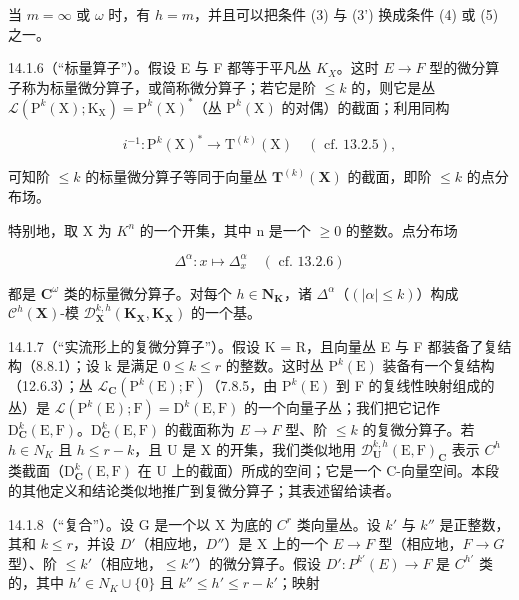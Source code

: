 当 \(m = \infty\) 或 \(\omega\) 时，有 \(h = m\)，并且可以把条件 (3) 与 (3') 换成条件 (4) 或 (5) 之一。

14.1.6（“标量算子”）。假设 E 与 F 都等于平凡丛 \(K_{X}\)。这时 \(E \rightarrow F\) 型的微分算子称为标量微分算子，或简称微分算子；若它是阶 \(\leqslant k\) 的，则它是丛 \(\mathcal{L}(\mathrm{P}^{k}(\mathrm{X}); \mathrm{K}_{\mathrm{X}}) = \mathrm{P}^{k}(\mathrm{X})^{*}\)（丛 \(\mathrm{P}^{k}(\mathrm{X})\) 的对偶）的截面；利用同构

\[
i ^ {- 1} \colon \mathrm{P} ^ {k} (\mathrm{X}) ^ {*} \rightarrow \mathrm{T} ^ {(k)} (\mathrm{X}) \quad (\text { cf. } 13.2.5),
\]

可知阶 \(\leqslant k\) 的标量微分算子等同于向量丛 \(\mathbf{T}^{(k)}(\mathbf{X})\) 的截面，即阶 \(\leqslant k\) 的点分布场。

特别地，取 X 为 \(K^{n}\) 的一个开集，其中 n 是一个 \(\geqslant0\) 的整数。点分布场

\[
\Delta^ {\alpha} \colon x \mapsto \Delta_ {x} ^ {\alpha} \quad (\text { cf. } 1 3. 2. 6)
\]

都是 \(\mathbf{C}^{\omega}\) 类的标量微分算子。对每个 \(h\in\mathbf{N}_{\mathbf{K}}\)，诸 \(\Delta^{\alpha}\)（\((|\alpha|\leqslant k)\)）构成 \(\mathcal{C}^{h}(\mathbf{X})\)-模 \(\mathcal{D}_{\mathbf{X}}^{k,h}(\mathbf{K}_{\mathbf{X}},\mathbf{K}_{\mathbf{X}})\) 的一个基。

14.1.7（“实流形上的复微分算子”）。假设 K = R，且向量丛 E 与 F 都装备了复结构（8.8.1）；设 k 是满足 \(0 \leqslant k \leqslant r\) 的整数。这时丛 \(\mathrm{P}^{k}(\mathrm{E})\) 装备有一个复结构（12.6.3）；丛 \(\mathcal{L}_{\mathbf{C}}(\mathrm{P}^{k}(\mathrm{E}); \mathrm{F})\)（7.8.5，由 \(\mathrm{P}^{k}(\mathrm{E})\) 到 F 的复线性映射组成的丛）是 \(\mathcal{L}(\mathrm{P}^{k}(\mathrm{E}); \mathrm{F}) = \mathrm{D}^{k}(\mathrm{E}, \mathrm{F})\) 的一个向量子丛；我们把它记作 \(\mathrm{D}_{\mathbf{C}}^{k}(\mathrm{E}, \mathrm{F})\)。\(\mathrm{D}_{\mathbf{C}}^{k}(\mathrm{E}, \mathrm{F})\) 的截面称为 \(E \to F\) 型、阶 \(\leqslant k\) 的复微分算子。若 \(h \in N_{K}\) 且 \(h \leqslant r - k\)，且 U 是 X 的开集，我们类似地用 \(\mathcal{D}_{\mathbf{U}}^{k,h}(\mathrm{E}, \mathrm{F})_{\mathbf{C}}\) 表示 \(C^{h}\) 类截面（\(\mathrm{D}_{\mathbf{C}}^{k}(\mathrm{E}, \mathrm{F})\) 在 U 上的截面）所成的空间；它是一个 C-向量空间。本段的其他定义和结论类似地推广到复微分算子；其表述留给读者。

14.1.8（“复合”）。设 G 是一个以 X 为底的 \(C^{r}\) 类向量丛。设 \(k'\) 与 \(k''\) 是正整数，其和 \(k \leqslant r\)，并设 \(D'\)（相应地，\(D''\)）是 X 上的一个 \(E \to F\) 型（相应地，\(F \to G\) 型）、阶 \(\leqslant k'\)（相应地，\(\leqslant k''\)）的微分算子。假设 \(D': P^{k'}(E) \to F\) 是 \(C^{h'}\) 类的，其中 \(h' \in N_{K} \cup \{0\}\) 且 \(k'' \leqslant h' \leqslant r - k'\)；映射

